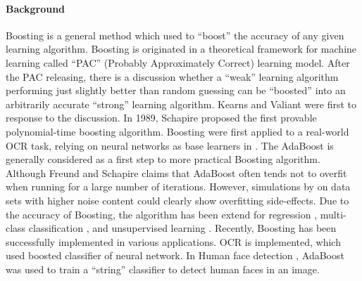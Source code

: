\paragraph{Background}
Boosting is a general method which used to ``boost'' the accuracy of any given learning algorithm. Boosting is originated in a theoretical framework for machine learning called ``PAC'' (Probably Approximately Correct) learning model\cite{Valiant1984}. After the PAC releasing,  there is a discussion whether a ``weak'' learning algorithm performing just slightly better than random guessing can be ``boosted'' into an arbitrarily accurate ``strong'' learning algorithm. Kearns and Valiant \cite{Kearns1994} were first to response to the discussion. In 1989, Schapire proposed the first provable polynomial-time boosting algorithm. Boosting were first applied to a real-world OCR task, relying on neural networks as base learners in \cite{Drucker1993}. The AdaBoost is generally considered as a first step to more practical Boosting algorithm. Although  Freund and Schapire \cite{Freund1995,Freund1999,Schapire1999} claims that AdaBoost often tends not to overfit when running for a large number of iterations. However, simulations by \cite{Grove1998} on data sets with higher noise content could clearly show overfitting side-effects. Due to the accuracy of Boosting, the algorithm has been extend for regression \cite{Friedman1998}, multi-class classification \cite{Zhu2006}, and unsupervised learning \cite{Ratsch2002}. Recently, Boosting has been successfully implemented in various applications. OCR \cite{Drucker1993} is implemented, which used boosted classifier of neural network. In Human face detection \cite{Viola2001}, AdaBoost was used to train a ``string'' classifier to detect human faces in an image.
